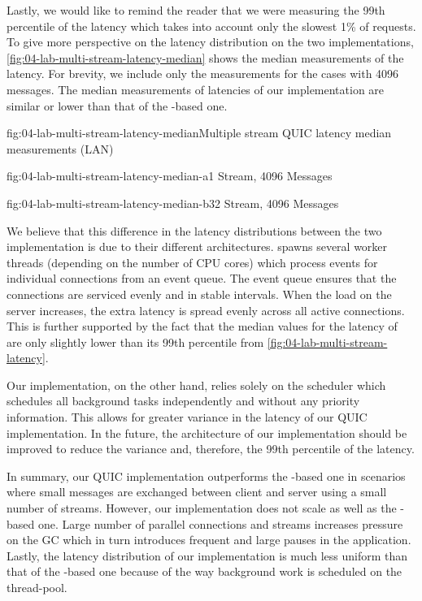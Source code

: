 Lastly, we would like to remind the reader that we were measuring the 99th percentile of the latency
which takes into account only the slowest 1\% of requests. To give more perspective on the latency
distribution on the two implementations, \autoref{fig:04-lab-multi-stream-latency-median} shows the
median measurements of the latency. For brevity, we include only the measurements for the cases with
\SI{4096}{\byte} messages. The median measurements of latencies of our implementation are similar or
lower than that of the \libmsquic{}-based one.

\begin{myFigure}{fig:04-lab-multi-stream-latency-median}{Multiple stream QUIC latency median measurements (LAN)}
\begin{mySubfigure}{0.49\linewidth}{fig:04-lab-multi-stream-latency-median-a}{1 Stream, \SI{4096}{\byte} Messages}
\footnotesize

\end{mySubfigure}
\begin{mySubfigure}{0.49\linewidth}{fig:04-lab-multi-stream-latency-median-b}{32 Stream, \SI{4096}{\byte} Messages}
\footnotesize

\end{mySubfigure}
\end{myFigure}

We believe that this difference in the latency distributions between the two implementation is due
to their different architectures. \libmsquic{} spawns several worker threads (depending on the
number of CPU cores) which process events for individual connections from an event queue. The event
queue ensures that the connections are serviced evenly and in stable intervals. When the load on the
server increases, the extra latency is spread evenly across all active connections. This is further
supported by the fact that the median values for the latency of \libmsquic{} are only slightly lower
than its 99th percentile from \autoref{fig:04-lab-multi-stream-latency}.

Our implementation, on the other hand, relies solely on the \dotnet{}  scheduler which
schedules all background tasks independently and without any priority information. This allows for
greater variance in the latency of our QUIC implementation. In the future, the architecture of our
implementation should be improved to reduce the variance and, therefore, the 99th percentile of the
latency.

In summary, our QUIC implementation outperforms the \libmsquic{}-based one in scenarios where small
messages are exchanged between client and server using a small number of streams. However, our
implementation does not scale as well as the \libmsquic-based one. Large number of parallel
connections and streams increases pressure on the GC which in turn introduces frequent and large
pauses in the application. Lastly, the latency distribution of our implementation is much less
uniform than that of the \libmsquic{}-based one because of the way background work is scheduled on
the \dotnet{} thread-pool.

